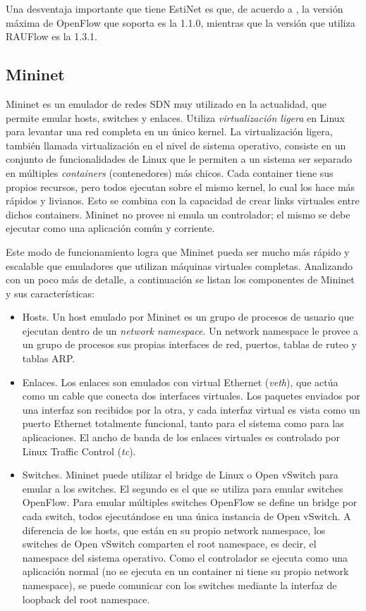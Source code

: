 Una desventaja importante que tiene EstiNet es que, de acuerdo a \cite{estinet}, la versión máxima de OpenFlow que soporta es la 1.1.0, mientras que la versión que utiliza RAUFlow es la 1.3.1.

\subsection{Mininet}
Mininet es un emulador de redes SDN muy utilizado en la actualidad, que permite emular hosts, switches y enlaces. Utiliza \textit{virtualización ligera} en Linux para levantar una red completa en un único kernel. La virtualización ligera, también llamada virtualización en el nivel de sistema operativo, consiste en un conjunto de funcionalidades de Linux que le permiten a un sistema ser separado en múltiples \textit{containers} (contenedores) más chicos. Cada container tiene sus propios recursos, pero todos ejecutan sobre el mismo kernel, lo cual los hace más rápidos y livianos. Esto se combina con la capacidad de crear links virtuales entre dichos containers. Mininet no provee ni emula un controlador; el mismo se debe ejecutar como una aplicación común y corriente.

Este modo de funcionamiento logra que Mininet pueda ser mucho más rápido y escalable que emuladores que utilizan máquinas virtuales completas. Analizando con un poco más de detalle, a continuación se listan los componentes de Mininet y sus características:
\begin{itemize}
	\item Hosts. Un host emulado por Mininet es un grupo de procesos de usuario que ejecutan dentro de un \textit{network namespace}. Un network namespace le provee a un grupo de procesos sus propias interfaces de red, puertos, tablas de ruteo y tablas ARP.
	\item Enlaces. Los enlaces son emulados con virtual Ethernet (\textit{veth}), que actúa como un cable que conecta dos interfaces virtuales. Los paquetes enviados por una interfaz son recibidos por la otra, y cada interfaz virtual es vista como un puerto Ethernet totalmente funcional, tanto para el sistema como para las aplicaciones. El ancho de banda de los enlaces virtuales es controlado por Linux Traffic Control (\textit{tc}).
	\item Switches. Mininet puede utilizar el bridge de Linux o Open vSwitch para emular a los switches. El segundo es el que se utiliza para emular switches OpenFlow. Para emular múltiples switches OpenFlow se define un bridge por cada switch, todos ejecutándose en una única instancia de Open vSwitch. A diferencia de los hosts, que están en su propio network namespace, los switches de Open vSwitch comparten el root namespace, es decir, el namespace del sistema operativo. Como el controlador se ejecuta como una aplicación normal (no se ejecuta en un container ni tiene su propio network namespace), se puede comunicar con los switches mediante la interfaz de loopback del root namespace.
\end{itemize}

